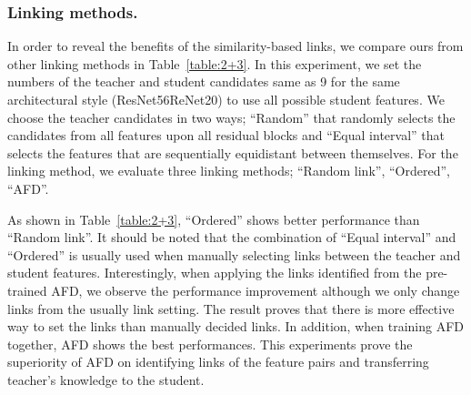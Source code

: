 \subsubsection{Linking methods.}
In order to reveal the benefits of the similarity-based links, we compare ours from other linking methods in Table~\ref{table:2+3}. In this experiment, we set the numbers of the teacher and student candidates same as 9 for the same architectural style (ResNet56ReNet20) to use all possible student features. We choose the teacher candidates in two ways; ``Random'' that randomly selects the candidates from all features upon all residual blocks and ``Equal interval'' that selects the features that are sequentially equidistant between themselves. For the linking method, we evaluate three linking methods; ``Random link'', ``Ordered'', ``AFD''.  

As shown in Table~\ref{table:2+3}, ``Ordered'' shows better performance than ``Random link''. It should be noted that the combination of ``Equal interval'' and ``Ordered'' is usually used when manually selecting links between the teacher and student features. Interestingly, when applying the links identified from the pre-trained AFD, we observe the performance improvement although we only change links from the usually link setting. The result proves that there is more effective way to set the links than manually decided links. 
In addition, when training AFD together, AFD shows the best performances. 
This experiments prove the superiority of AFD on identifying links of the feature pairs and transferring teacher's knowledge to the student.

